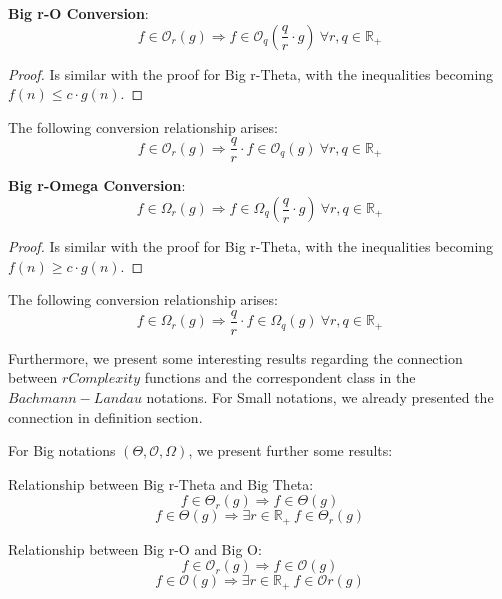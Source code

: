 \begin{theorem}
    \textbf{Big r-O Conversion}:
    \[  f \in \mathcal{O}_{r}(g) \Rightarrow f \in \mathcal{O}_{q} \left( \frac{q}{r} \cdot g \right) \ \forall r,q \in \mathbb{R}_{+}\]
\end{theorem}
\begin{proof}
    Is similar with the proof for Big r-Theta, with the inequalities becoming $f(n) \leq c \cdot g(n)$.
\end{proof}
\begin{corollary}
    The following conversion relationship arises:
    \[  f \in \mathcal{O}_{r}(g) \Rightarrow \frac{q}{r} \cdot f \in \mathcal{O}_{q} \left(  g \right) \ \forall r,q \in \mathbb{R}_{+}\]
\end{corollary}
\begin{theorem}
    \textbf{Big r-Omega Conversion}:
    \[  f \in \Omega_{r}(g) \Rightarrow f \in \Omega_{q} \left( \frac{q}{r} \cdot g \right) \ \forall r,q \in \mathbb{R}_{+}\]
\end{theorem}
\begin{proof}
    Is similar with the proof for Big r-Theta, with the inequalities becoming $f(n) \geq c \cdot g(n)$.
\end{proof}
\begin{corollary}
    The following conversion relationship arises:
    \[  f \in \Omega_{r}(g) \Rightarrow \frac{q}{r} \cdot f \in \Omega_{q} \left( g \right) \ \forall r,q \in \mathbb{R}_{+}\]
\end{corollary}


Furthermore, we present some interesting results regarding the connection between $rComplexity$ functions and the correspondent class in the $Bachmann-Landau$ notations. For Small notations, we already presented the connection in definition section.

For Big notations $(\Theta, \mathcal{O}, \Omega)$, we present further some results:

\begin{theorem}
    Relationship between Big r-Theta and Big Theta:
    \[  f \in \Theta_{r}(g) \Rightarrow f \in \Theta (g) \]
    \[  f \in \Theta(g) \Rightarrow \exists r \in \mathbb{R}_{+}\ f \in \Theta_{r}(g) \]
\end{theorem}

\begin{theorem}
    Relationship between Big r-O and Big O:
    \[  f \in \mathcal{O}_{r}(g) \Rightarrow f \in \mathcal{O} (g) \]
    \[  f \in \mathcal{O}(g) \Rightarrow \exists r \in \mathbb{R}_{+}\ f \in \mathcal{O}{r}(g) \]
\end{theorem}


